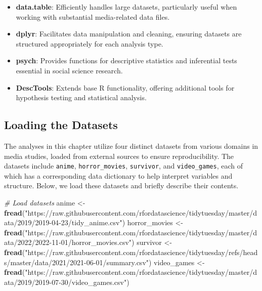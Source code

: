 \documentclass[
]{book}
\newenvironment{Shaded}{\begin{snugshade}}{\end{snugshade}}
\newcommand{\CommentTok}[1]{\textcolor[rgb]{0.56,0.35,0.01}{\textit{#1}}}
\newcommand{\FunctionTok}[1]{\textcolor[rgb]{0.13,0.29,0.53}{\textbf{#1}}}
\newcommand{\NormalTok}[1]{#1}
\newcommand{\OtherTok}[1]{\textcolor[rgb]{0.56,0.35,0.01}{#1}}
\newcommand{\StringTok}[1]{\textcolor[rgb]{0.31,0.60,0.02}{#1}}
\providecommand{\tightlist}{%
  \setlength{\itemsep}{0pt}\setlength{\parskip}{0pt}}
\begin{document}
\begin{itemize}
\tightlist
\item
  \textbf{data.table}: Efficiently handles large datasets, particularly useful when working with substantial media-related data files.
\item
  \textbf{dplyr}: Facilitates data manipulation and cleaning, ensuring datasets are structured appropriately for each analysis type.
\item
  \textbf{psych}: Provides functions for descriptive statistics and inferential tests essential in social science research.
\item
  \textbf{DescTools}: Extends base R functionality, offering additional tools for hypothesis testing and statistical analysis.
\end{itemize}

\subsection*{Loading the Datasets}\label{loading-the-datasets}

The analyses in this chapter utilize four distinct datasets from various domains in media studies, loaded from external sources to ensure reproducibility. The datasets include \texttt{anime}, \texttt{horror\_movies}, \texttt{survivor}, and \texttt{video\_games}, each of which has a corresponding data dictionary to help interpret variables and structure. Below, we load these datasets and briefly describe their contents.

\begin{Shaded}
\begin{Highlighting}[]
\CommentTok{\# Load datasets}
\NormalTok{anime }\OtherTok{\textless{}{-}} \FunctionTok{fread}\NormalTok{(}\StringTok{"https://raw.githubusercontent.com/rfordatascience/tidytuesday/master/data/2019/2019{-}04{-}23/tidy\_anime.csv"}\NormalTok{)}
\NormalTok{horror\_movies }\OtherTok{\textless{}{-}} \FunctionTok{fread}\NormalTok{(}\StringTok{"https://raw.githubusercontent.com/rfordatascience/tidytuesday/master/data/2022/2022{-}11{-}01/horror\_movies.csv"}\NormalTok{)}
\NormalTok{survivor }\OtherTok{\textless{}{-}} \FunctionTok{fread}\NormalTok{(}\StringTok{"https://raw.githubusercontent.com/rfordatascience/tidytuesday/refs/heads/master/data/2021/2021{-}06{-}01/summary.csv"}\NormalTok{)}
\NormalTok{video\_games }\OtherTok{\textless{}{-}} \FunctionTok{fread}\NormalTok{(}\StringTok{"https://raw.githubusercontent.com/rfordatascience/tidytuesday/master/data/2019/2019{-}07{-}30/video\_games.csv"}\NormalTok{)}
\end{Highlighting}
\end{Shaded}
\end{document}
